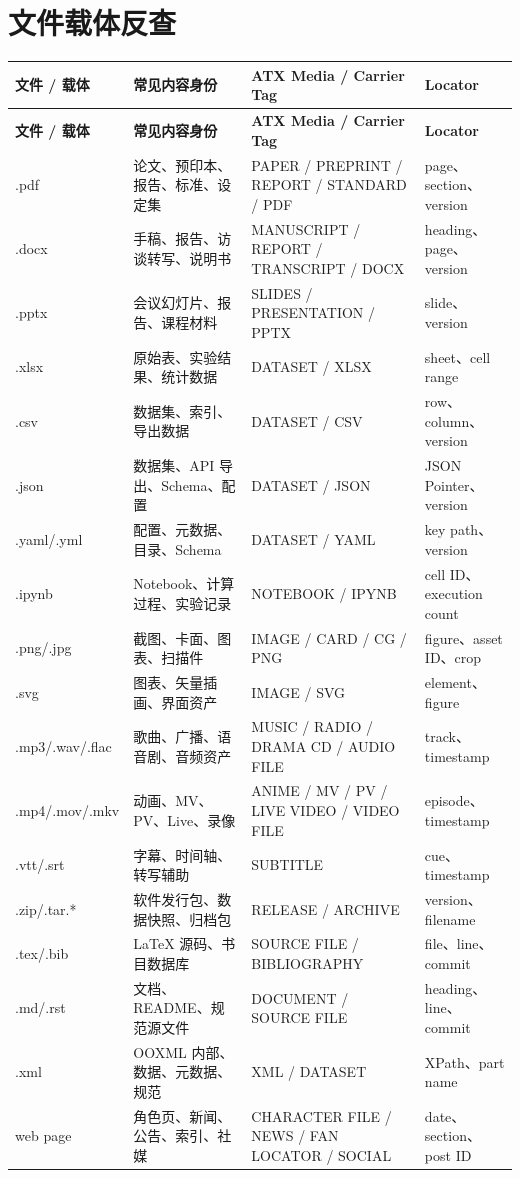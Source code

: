 \documentclass[profile=editorial,titlelayout=\AtelierSpecimenTitleLayout]{atelier}
\begin{document}
\section{文件载体反查}
\small
\begin{longtable}{@{}p{22mm}p{50mm}p{47mm}p{46mm}@{}}
\toprule
\textbf{文件 / 载体} & \textbf{常见内容身份} & \textbf{ATX Media / Carrier Tag} & \textbf{Locator}\\
\midrule
\endfirsthead
\toprule
\textbf{文件 / 载体} & \textbf{常见内容身份} & \textbf{ATX Media / Carrier Tag} & \textbf{Locator}\\
\midrule
\endhead
.pdf & 论文、预印本、报告、标准、设定集 & PAPER / PREPRINT / REPORT / STANDARD / PDF & page、section、version \\
.docx & 手稿、报告、访谈转写、说明书 & MANUSCRIPT / REPORT / TRANSCRIPT / DOCX & heading、page、version \\
.pptx & 会议幻灯片、报告、课程材料 & SLIDES / PRESENTATION / PPTX & slide、version \\
.xlsx & 原始表、实验结果、统计数据 & DATASET / XLSX & sheet、cell range \\
.csv & 数据集、索引、导出数据 & DATASET / CSV & row、column、version \\
.json & 数据集、API 导出、Schema、配置 & DATASET / JSON & JSON Pointer、version \\
.yaml/.yml & 配置、元数据、目录、Schema & DATASET / YAML & key path、version \\
.ipynb & Notebook、计算过程、实验记录 & NOTEBOOK / IPYNB & cell ID、execution count \\
.png/.jpg & 截图、卡面、图表、扫描件 & IMAGE / CARD / CG / PNG & figure、asset ID、crop \\
.svg & 图表、矢量插画、界面资产 & IMAGE / SVG & element、figure \\
.mp3/.wav/.flac & 歌曲、广播、语音剧、音频资产 & MUSIC / RADIO / DRAMA CD / AUDIO FILE & track、timestamp \\
.mp4/.mov/.mkv & 动画、MV、PV、Live、录像 & ANIME / MV / PV / LIVE VIDEO / VIDEO FILE & episode、timestamp \\
.vtt/.srt & 字幕、时间轴、转写辅助 & SUBTITLE & cue、timestamp \\
.zip/.tar.* & 软件发行包、数据快照、归档包 & RELEASE / ARCHIVE & version、filename \\
.tex/.bib & LaTeX 源码、书目数据库 & SOURCE FILE / BIBLIOGRAPHY & file、line、commit \\
.md/.rst & 文档、README、规范源文件 & DOCUMENT / SOURCE FILE & heading、line、commit \\
.xml & OOXML 内部、数据、元数据、规范 & XML / DATASET & XPath、part name \\
web page & 角色页、新闻、公告、索引、社媒 & CHARACTER FILE / NEWS / FAN LOCATOR / SOCIAL & date、section、post ID \\
\bottomrule
\end{longtable}
\normalsize
\end{document}
